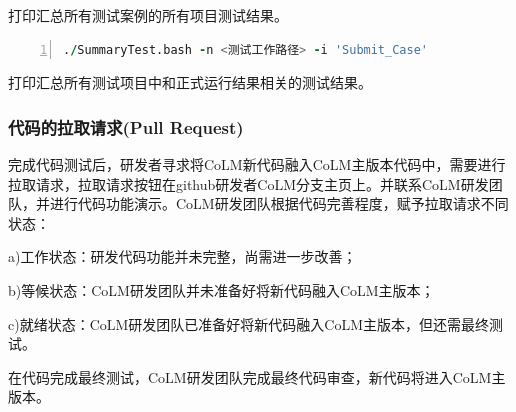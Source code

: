 打印汇总所有测试案例的所有项目测试结果。

\begin{lstlisting}[language=fortran, basicstyle=\linespread{1.0}\footnotesize\ttfamily, commentstyle=\color{olive}, numbers=left, numberstyle=\tiny, xleftmargin=1.5em,xrightmargin=0em, aboveskip=1em]
   ./SummaryTest.bash -n <测试工作路径> -i 'Submit_Case'
\end{lstlisting}

打印汇总所有测试项目中和正式运行结果相关的测试结果。

\subsubsection{代码的拉取请求(Pull Request)}

完成代码测试后，研发者寻求将CoLM新代码融入CoLM主版本代码中，需要进行拉取请求，拉取请求按钮在github研发者CoLM分支主页上。并联系CoLM研发团队，并进行代码功能演示。CoLM研发团队根据代码完善程度，赋予拉取请求不同状态：

a)工作状态：研发代码功能并未完整，尚需进一步改善；

b)等候状态：CoLM研发团队并未准备好将新代码融入CoLM主版本；

c)就绪状态：CoLM研发团队已准备好将新代码融入CoLM主版本，但还需最终测试。

在代码完成最终测试，CoLM研发团队完成最终代码审查，新代码将进入CoLM主版本。
